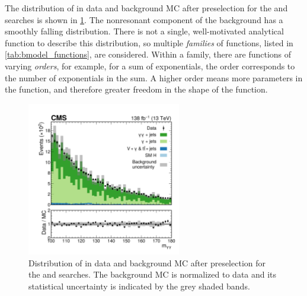 The distribution of \mgg in data and background MC after preselection for the \XHH and \XYttHgg searches is shown in \cref{fig:mgg_data_bkg_mc}. The nonresonant component of the background has a smoothly falling \mgg distribution. There is not a single, well-motivated analytical function to describe this distribution, so multiple \textit{families} of functions, listed in \cref{tab:bmodel_functions}, are considered. Within a family, there are functions of varying \textit{orders}, for example, for a sum of exponentials, the order corresponds to the number of exponentials in the sum. A higher order means more parameters in the function, and therefore greater freedom in the shape of the function. 

\begin{figure}
  \centering
  \includegraphics[width=0.6\textwidth]{Figures/Dihiggs/diphoton_mass.pdf}
  \caption[Distribution of \mgg in Data and Background MC After Preselection for the \XHH and \XYttHgg Searches]{Distribution of \mgg in data and background MC after preselection for the \XHH and \XYttHgg searches. The background MC is normalized to data and its statistical uncertainty is indicated by the grey shaded bands.}\label{fig:mgg_data_bkg_mc}
\end{figure}

